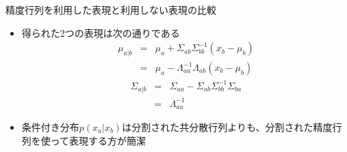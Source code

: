 \begin{frame}{精度行列を利用した表現と利用しない表現の比較}
 \begin{itemize}
  \item 得られた2つの表現は次の通りである
        \begin{eqnarray*}
         \mu_{a|b} &=& \mu_a + \Sigma_{ab}\Sigma_{bb}^{-1}(x_b-\mu_b)\\
         &=& \mu_a-\Lambda_{aa}^{-1}\Lambda_{ab}(x_b-\mu_b)
        \end{eqnarray*}
        \begin{eqnarray*}
         \Sigma_{a|b} &=& \Sigma_{aa} - \Sigma_{ab}\Sigma_{bb}^{-1}\Sigma_{ba} \\
         & =& \Lambda_{aa}^{-1}
        \end{eqnarray*}
  \item 条件付き分布$p(x_a|x_b)$は分割された共分散行列よりも、分割された精度行列を使って表現する方が簡潔
 \end{itemize}
\end{frame}
